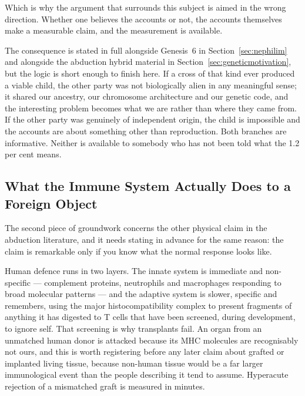 Which is why the argument that surrounds this subject is aimed in the wrong direction. Whether one
believes the accounts or not, the accounts themselves make a measurable claim, and the measurement
is available.


The consequence is stated in full alongside Genesis~6 in Section~\ref{sec:nephilim} and alongside the
abduction hybrid material in Section~\ref{sec:geneticmotivation}, but the logic is short enough to
finish here. If a cross of that kind ever produced a viable child, the other party was not
biologically alien in any meaningful sense; it shared our ancestry, our chromosome architecture and
our genetic code, and the interesting problem becomes what we are rather than where they came from.
If the other party was genuinely of independent origin, the child is impossible and the accounts are
about something other than reproduction. Both branches are informative. Neither is available to
somebody who has not been told what the 1.2 per cent means.

\subsection{What the Immune System Actually Does to a Foreign Object}

The second piece of groundwork concerns the other physical claim in the abduction literature, and
it needs stating in advance for the same reason: the claim is remarkable only if you know what the
normal response looks like.

Human defence runs in two layers. The innate system is immediate and non-specific --- complement
proteins, neutrophils and macrophages responding to broad molecular patterns --- and the adaptive
system is slower, specific and remembers, using the major histocompatibility complex to present
fragments of anything it has digested to T cells that have been screened, during development, to
ignore self. That screening is why transplants fail. An organ from an unmatched human donor is
attacked because its MHC molecules are recognisably not ours, and this is worth registering before
any later claim about grafted or implanted living tissue, because non-human tissue would be a far
larger immunological event than the people describing it tend to assume. Hyperacute rejection of a
mismatched graft is measured in minutes.

